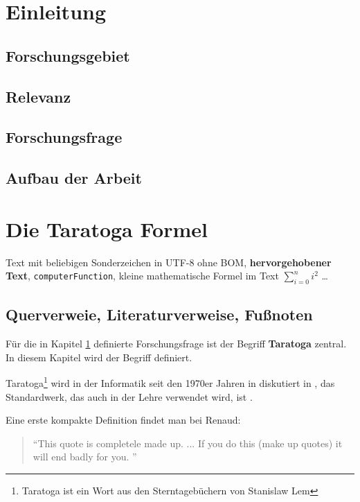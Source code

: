 \section{Einleitung}
\label{section:Einleitung}

\subsection{Forschungsgebiet}
\subsection{Relevanz}
\subsection{Forschungsfrage}
\subsection{Aufbau der Arbeit}

\section{Die Taratoga Formel}

Text mit beliebigen Sonderzeichen in UTF-8 ohne BOM, 
\textbf{hervorgehobener Text},
\texttt{computerFunction}, kleine mathematische Formel im Text $\sum_{i=0}^n i^2$
\ldots

\subsection{Querverweie, Literaturverweise, Fußnoten}
Für die in Kapitel \ref{section:Einleitung} definierte Forschungsfrage
ist der Begriff \textbf{Taratoga} zentral. In diesem Kapitel wird
der Begriff definiert.

Taratoga\footnote{Taratoga ist ein Wort aus den Sterntagebüchern von Stanislaw Lem} wird in der Informatik
seit den 1970er Jahren in diskutiert in \autocites{McConnell:2004}{Vandevoorde:2002},
das Standardwerk, das auch in der Lehre verwendet wird, ist 
\autocite{Tanenbaum:2003}.

Eine erste kompakte Definition findet man bei Renaud: 

\begin{quote}
``This quote is completele made up. ... If you do this (make up quotes)
it will end badly for you. ''
\autocite[S.305]{Renaud:2004}
\end{quote}


